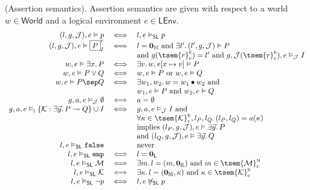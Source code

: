  (Assertion semantics). Assertion semantics are given with respect to a world $w \in \mathsf{World}$ and a logical environment $e \in \mathsf{LEnv}$.
\begingroup
\renewcommand*{\arraystretch}{1.5}
\[
\begin{array}{r c l}
	(l, g, \mathcal{J}), e \vDash p
	&
	\iff
	&
	l, e \vDash_\mathsf{SL} p
\\
	(l, g, \mathcal{J}), e \vDash \boxed{P}_I^r
	&
	\iff
	&
	l = \mathbf{0}_\mathbb{M} \text{ and } \exists l' \ldotp (l', g, \mathcal{J}) \vDash P
	\\ && \text{and } g(\tsem{r}_e^\textsc{e}) = l' \text{ and } g, \mathcal{J}(\tsem{r}_e^\textsc{e}), e \vDash_\mathcal{J} I
\\
	w, e \vDash \exists x \ldotp P
	&
	\iff
	&
	\exists v \ldotp w, e[x \mapsto v] \vDash P
\\
	w, e \vDash P \lor Q
	&
	\iff
	&
	w, e \vDash P \text{ or } w, e \vDash Q
\\
	w, e \vDash P \sep Q
	&
	\iff
	&
	\exists w_1, w_2 \ldotp w = w_1 \bullet w_2 \text{ and } \\ && w_1, e \vDash P \text{ and } w_2, e \vDash Q
\\
	g, a, e \vDash_\mathcal{J} \emptyset
	&
	\iff	
	&
	a = \emptyset
\\
	g, a, e \vDash_\textsc{i} \{ \mathcal{K} : \exists \vec{y} \ldotp P \leadsto Q \} \cup I
	&
	\iff
	&
	g, a, e \vDash_\mathcal{J} I \text{ and } \\ && \forall \kappa \in \tsem{\mathcal{K}}_e^\textsc{k}, l_P, l_Q \ldotp (l_P, l_Q) = a(\kappa) \\ && \text{implies } (l_P, g, \mathcal{J}), e \vDash \exists \vec{y} \ldotp P \\ && \text{and } (l_Q, g, \mathcal{J}), e \vDash \exists \vec{y} \ldotp Q
\\
	l, e \vDash_\mathsf{SL} \mathtt{false}
	&&
	\text{never}
\\
	l, e \vDash_\mathsf{SL}  \mathtt{emp}
	&
	\iff
	&
	l = \mathbf{0}_\mathsf{L}
\\
	l, e \vDash_\mathsf{SL} \mathcal{M}
	&
	\iff
	&
	\exists m \ldotp l = (m, \mathbf{0}_\mathbb{K}) \text{ and } m \in \tsem{\mathcal{M}}_e^\textsc{m}
\\
	l, e \vDash_\mathsf{SL} \mathcal{K}
	&
	\iff
	&
	\exists \kappa \ldotp l = (\mathbf{0}_\mathbb{M}, \kappa) \text{ and } \kappa \in \tsem{\mathcal{K}}_e^\textsc{k}
\\
	l, e \vDash_\mathsf{SL} \lnot p
	&
	\iff
	&
	l, e \not\vDash_\mathsf{SL} p
\\

\end{array}\]
